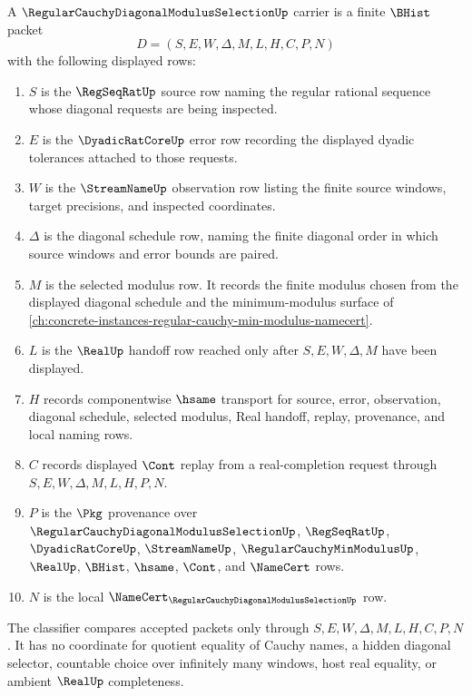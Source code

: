 \begin{definition}
\label{def:regular-cauchy-diagonal-modulus-selection-carrier}
A $\RegularCauchyDiagonalModulusSelectionUp$ carrier is a finite $\BHist$ packet
$$
D=(S,E,W,\Delta,M,L,H,C,P,N)
$$
with the following displayed rows:
\begin{enumerate}
\item $S$ is the $\RegSeqRatUp$ source row naming the regular rational sequence whose diagonal requests are being inspected.
\item $E$ is the $\DyadicRatCoreUp$ error row recording the displayed dyadic tolerances attached to those requests.
\item $W$ is the $\StreamNameUp$ observation row listing the finite source windows, target precisions, and inspected coordinates.
\item $\Delta$ is the diagonal schedule row, naming the finite diagonal order in which source windows and error bounds are paired.
\item $M$ is the selected modulus row. It records the finite modulus chosen from the displayed diagonal schedule and the minimum-modulus surface of \autoref{ch:concrete-instances-regular-cauchy-min-modulus-namecert}.
\item $L$ is the $\RealUp$ handoff row reached only after $S,E,W,\Delta,M$ have been displayed.
\item $H$ records componentwise $\hsame$ transport for source, error, observation, diagonal schedule, selected modulus, Real handoff, replay, provenance, and local naming rows.
\item $C$ records displayed $\Cont$ replay from a real-completion request through $S,E,W,\Delta,M,L,H,P,N$.
\item $P$ is the $\Pkg$ provenance over $\RegularCauchyDiagonalModulusSelectionUp$, $\RegSeqRatUp$, $\DyadicRatCoreUp$, $\StreamNameUp$, $\RegularCauchyMinModulusUp$, $\RealUp$, $\BHist$, $\hsame$, $\Cont$, and $\NameCert$ rows.
\item $N$ is the local $\NameCert_{\RegularCauchyDiagonalModulusSelectionUp}$ row.
\end{enumerate}
The classifier compares accepted packets only through $S,E,W,\Delta,M,L,H,C,P,N$. It has no coordinate for quotient equality of Cauchy names, a hidden diagonal selector, countable choice over infinitely many windows, host real equality, or ambient $\RealUp$ completeness.
\end{definition}

